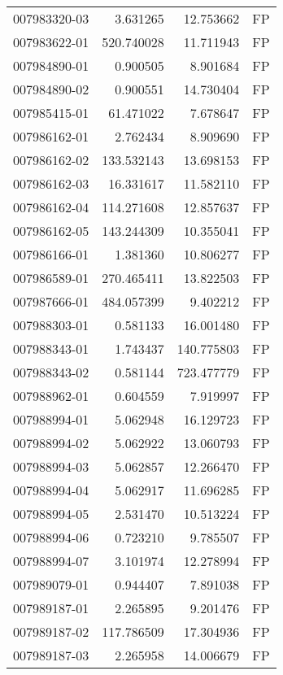 \begin{tabular}{lrrl}
007983320-03 &    3.631265 &      12.753662 &   FP \\
007983622-01 &  520.740028 &      11.711943 &   FP \\
007984890-01 &    0.900505 &       8.901684 &   FP \\
007984890-02 &    0.900551 &      14.730404 &   FP \\
007985415-01 &   61.471022 &       7.678647 &   FP \\
007986162-01 &    2.762434 &       8.909690 &   FP \\
007986162-02 &  133.532143 &      13.698153 &   FP \\
007986162-03 &   16.331617 &      11.582110 &   FP \\
007986162-04 &  114.271608 &      12.857637 &   FP \\
007986162-05 &  143.244309 &      10.355041 &   FP \\
007986166-01 &    1.381360 &      10.806277 &   FP \\
007986589-01 &  270.465411 &      13.822503 &   FP \\
007987666-01 &  484.057399 &       9.402212 &   FP \\
007988303-01 &    0.581133 &      16.001480 &   FP \\
007988343-01 &    1.743437 &     140.775803 &   FP \\
007988343-02 &    0.581144 &     723.477779 &   FP \\
007988962-01 &    0.604559 &       7.919997 &   FP \\
007988994-01 &    5.062948 &      16.129723 &   FP \\
007988994-02 &    5.062922 &      13.060793 &   FP \\
007988994-03 &    5.062857 &      12.266470 &   FP \\
007988994-04 &    5.062917 &      11.696285 &   FP \\
007988994-05 &    2.531470 &      10.513224 &   FP \\
007988994-06 &    0.723210 &       9.785507 &   FP \\
007988994-07 &    3.101974 &      12.278994 &   FP \\
007989079-01 &    0.944407 &       7.891038 &   FP \\
007989187-01 &    2.265895 &       9.201476 &   FP \\
007989187-02 &  117.786509 &      17.304936 &   FP \\
007989187-03 &    2.265958 &      14.006679 &   FP \\

\end{tabular}
